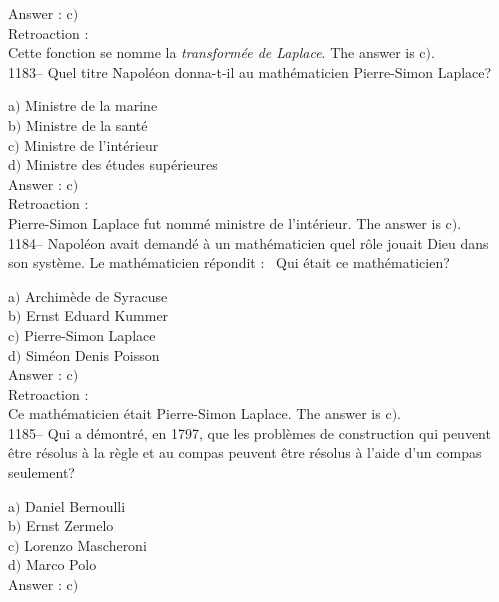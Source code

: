 ﻿\documentclass[letterpaper, 12pt]{article}
\begin{document}
Answer : c$)$\\

Retroaction : \\
Cette fonction se nomme la {\sl transform\'ee de Laplace}.
The answer is c$)$.\\

1183-- Quel titre Napol\'eon  donna-t-il au math\'ematicien
Pierre-Simon Laplace?

a$)$ Ministre de la marine \\
b$)$ Ministre de la sant\'e \\
c$)$ Ministre de l'int\'erieur  \\
d$)$ Ministre des \'etudes sup\'erieures\\

Answer : c$)$\\

Retroaction : \\
Pierre-Simon Laplace fut nomm\'e ministre de l'int\'erieur.
The answer is c$)$.\\

1184-- Napol\'eon avait demand\'e \`a un math\'ematicien quel r\^ole
jouait Dieu dans son syst\`eme. Le math\'ematicien r\'epondit :
\fg\ Qui
\'etait ce math\'ematicien?

a$)$ Archim\`ede de Syracuse \\
b$)$ Ernst Eduard Kummer \\
c$)$ Pierre-Simon Laplace \\
d$)$ Sim\'eon Denis Poisson\\

Answer : c$)$\\

Retroaction : \\
Ce math\'ematicien \'etait Pierre-Simon Laplace.
The answer is c$)$.\\

1185-- Qui a d\'emontr\'e, en 1797, que les probl\`emes de
construction qui peuvent \^etre r\'esolus \`a la r\`egle et au
compas peuvent \^etre r\'esolus \`a l'aide d'un compas seulement?

a$)$ Daniel Bernoulli \\
b$)$ Ernst Zermelo \\
c$)$ Lorenzo Mascheroni \\
d$)$ Marco Polo\\

Answer : c$)$\\
\end{document}
